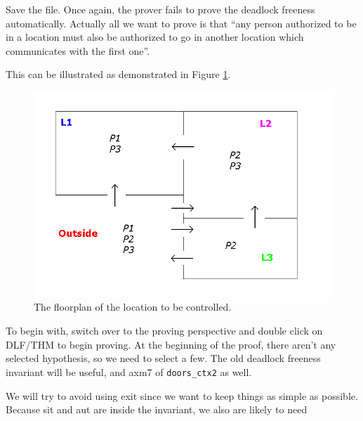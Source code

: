 Save the file. Once again, the prover fails to prove the deadlock freeness automatically. Actually all we want to prove is that ``any person authorized to be in a location must also be authorized to go in another location which communicates with the first one''.

This can be illustrated as demonstrated in Figure \ref{fig_tut_10_graph}.

\begin{figure}[!ht]
\begin{center}
	\includegraphics[]{img/tutorial/tut_10_graph.png}
	\caption{The floorplan of the location to be controlled.}
	\label{fig_tut_10_graph}
\end{center}
\end{figure}

To begin with, switch over to the proving perspective and double click on \textsf{DLF/THM} to begin proving. At the beginning of the proof, there aren't any selected hypothesis, so we need to select a few. The old deadlock freeness invariant will be useful, and \textsf{axm7} of \texttt{doors\_ctx2} as well. 

\begin{description}
\AXIOMS
	\begin{description}
	\end{description}
\end{description}

We will try to avoid using \textsf{exit} since we want to keep things as simple as possible. Because \textsf{sit} and \textsf{aut} are inside the invariant, we also are likely to need 

